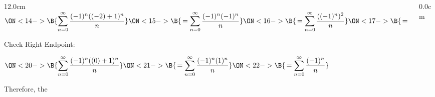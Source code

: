 \begin{frame}
\begin{columns}
\begin{column}{12.0cm}
$\displaystyle{\ON<14->{\B{\sum \limits_{n=0}^{\infty} \frac{(-1)^n((-2)+1)^n}{n}}} \ON<15->{\B{\,= \sum \limits_{n=0}^{\infty} \frac{(-1)^n(-1)^n}{n}}} \ON<16->{\B{\,= \sum \limits_{n=0}^{\infty} \frac{((-1)^n)^2}{n}}} \ON<17->{\B{\,= \sum \limits_{n=0}^{\infty} \frac{1}{n}}} }$ \quad 
{}

\vspace{0.3cm}

Check Right Endpoint:  \\

\vspace{0.2cm}

$\displaystyle{\ON<20->{\B{\sum \limits_{n=0}^{\infty} \frac{(-1)^n((0)+1)^n}{n}}} \ON<21->{\B{\,= \sum \limits_{n=0}^{\infty} \frac{(-1)^n(1)^n}{n}}} \ON<22->{\B{\,= \sum \limits_{n=0}^{\infty} \frac{(-1)^n}{n}}} }$ \quad 
{}\\
  

\vspace{0.1cm}

Therefore, the \fbox{IoC = \ON<27->{\B{$(-2,0]$}}}
\vspace{10.5cm}

\end{column}
\begin{column}{0.0cm}
	
\end{column}
\end{columns}
\end{frame}

